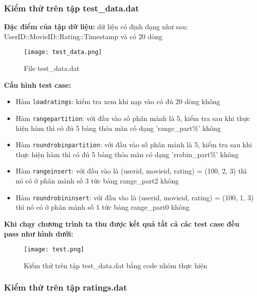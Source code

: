 \documentclass[14pt]{extarticle}
\begin{document}
\subsubsection{Kiểm thử trên tập test\_data.dat}
\textbf{Đặc điểm của tập dữ liệu:} dữ liệu có định dạng như sau: UserID::MovieID::Rating::Timestamp và có 20 dòng
\begin{figure}[H]
    \centering
    \texttt{[image: test\_data.png]}
    \caption{File test\_data.dat}

\end{figure}
\textbf{Cấu hình test case:}
\begin{itemize}
    \item Hàm \texttt{loadratings}: kiểm tra xem khi nạp vào có đủ 20 dòng không
    \item Hàm \texttt{rangepartition}: với đầu vào số phân mảnh là 5, kiểm tra sau khi thực hiện hàm thì có đủ 5 bảng thỏa mãn có dạng 'range\_part\%' không
    \item Hàm \texttt{roundrobinpartition}: với đầu vào số phân mảnh là 5, kiểm tra sau khi thực hiện hàm thì có đủ 5 bảng thỏa mãn có dạng 'rrobin\_part\%' không
    \item Hàm \texttt{rangeinsert}: với đầu vào là (userid, movieid, rating) = (100, 2, 3) thì nó có ở phân mảnh số 3 tức bảng range\_part2 không
    \item Hàm \texttt{roundrobininsert}: với đầu vào là (userid, movieid, rating) = (100, 1, 3) thì nó có ở phân mảnh số 1 tức bảng range\_part0 không
\end{itemize}
\textbf{Khi chạy chương trình ta thu được kết quả tất cả các test case đều pass như hình dưới:}
\begin{figure}[H]
    \centering
    \texttt{[image: test.png]}
    \caption{Kiểm thử trên tập test\_data.dat bằng code nhóm thực hiện}

\end{figure}
\subsubsection{Kiểm thử trên tập ratings.dat}
\end{document}

